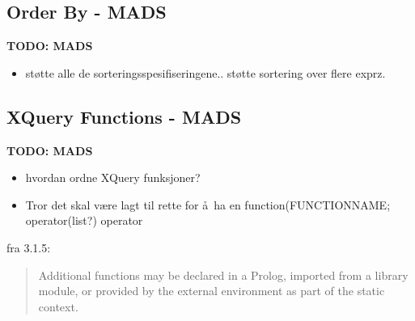 \subsection{Order By - {MADS}}
\label{sect:disc:orderby}
\textbf{\LARGE TODO: {MADS}}
\begin{itemize}
  \item st\o tte alle de sorteringsspesifiseringene.. st\o tte sortering over flere exprz.
\end{itemize}
	
	
	
	\subsection{XQuery Functions - {MADS}}
\label{sect:disc:functions}
\textbf{\LARGE TODO: {MADS}}
\begin{itemize}
  \item hvordan ordne XQuery funksjoner?
  \item Tror det skal v\ae re lagt til rette for \aa~ha en \textsf{function(FUNCTIONNAME; operator(list?)} operator
  \end{itemize}
  
fra 3.1.5:
\begin{quote}
  Additional functions may be declared in a Prolog, imported from a library module, or provided by the external
  environment as part of the static context.
  \end{quote}